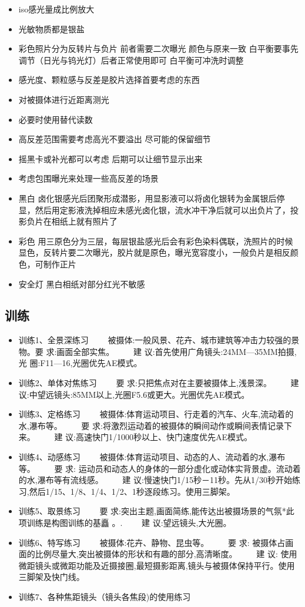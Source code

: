 \documentclass[
  letterpaper,
  DIV=11,
  numbers=noendperiod]{scrreprt}
\providecommand{\tightlist}{%
  \setlength{\itemsep}{0pt}\setlength{\parskip}{0pt}}\usepackage{longtable,booktabs,array}
\begin{document}
\begin{itemize}
\tightlist
\item
  iso感光量成比例放大
\item
  光敏物质都是银盐
\item
  彩色照片分为反转片与负片 前者需要二次曝光 颜色与原来一致
  白平衡要事先调节（日光与钨光灯）后者正常使用即可 白平衡可冲洗时调整
\item
  感光度、颗粒感与反差是胶片选择首要考虑的东西
\item
  对被摄体进行近距离测光
\item
  必要时使用替代读数
\item
  高反差范围需要考虑高光不要溢出 尽可能的保留细节
\item
  摇黑卡或补光都可以考虑 后期可以让细节显示出来
\item
  考虑包围曝光来处理一些高反差的场景
\item
  黑白
  卤化银感光后团聚形成潜影，用显影液可以将卤化银转为金属银后停显，然后用定影液洗掉相应未感光卤化银，流水冲干净后就可以出负片了，投影负片在相纸上就有照片了
\item
  彩色
  用三原色分为三层，每层银盐感光后会有彩色染料偶联，洗照片的时候显色，反转片要二次曝光，胶片就是原色，曝光宽容度小，一般负片是相反颜色，可制作正片
\item
  安全灯 黑白相纸对部分红光不敏感
\end{itemize}

\subsection{训练}\label{ux8badux7ec3}

\begin{itemize}
\item
  训练1、全景深练习
  　　被摄体:一般风景、花卉、城市建筑等冲击力较强的景物。要
  求:画面全部实焦。 　　建 议:首先使用广角镜头:24MM---35MM拍摄, 光
  圈:F11---16,光圈优先AE模式。
\item
  训练2、单体对焦练习 　　要 求:只把焦点对在主要被摄体上,浅景深。 　　建
  议:中望远镜头:85MM以上,光圈F5.6或更大。光圈优先AE模式。
\item
  训练3、定格练习
  　　被摄体:体育运动项目、行走着的汽车、火车,流动着的水,瀑布等。 　　要
  求:将激烈运动着的被摄体的瞬间动作或瞬间表情记录下来。 　　建
  议:高速快门1/1000秒以上、快门速度优先AE模式。
\item
  训练4、动感练习 　　被摄体:体育运动项目、动态的人、流动着的水,瀑布等。
  　　要 求:
  运动员和动态人的身体的一部分虚化或动体实背景虚。流动着的水,瀑布等有流线感。
  　　建
  议:慢速快门1/15秒－11秒。先从1/30秒开始练习,然后1/15、1/8、1/4、1/2、1秒逐段练习。使用三脚架。
\item
  训练5、取景练习 　　要
  求:突出主题,画面简练,能传达出被摄场景的气氛*此项训练是构图训练的基矗
  。. 　　建 议:望远镜头,大光圈。
\item
  训练6、特写练习 　　被摄体:花卉、静物、昆虫等。 　　要 求:
  被摄体占画面的比例尽量大,突出被摄体的形状和有趣的部分,高清晰度。
  　　建 议:
  使用微距镜头或微距功能及近摄接圈,最短摄影距离,镜头与被摄体保持平行。使用三脚架及快门线。
\item
  训练7、各种焦距镜头（镜头各焦段)的使用练习
\end{itemize}
\end{document}
